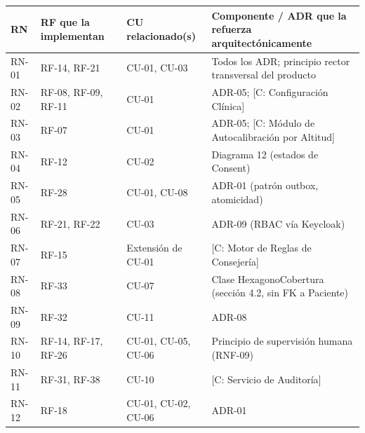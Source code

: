 \documentclass[11pt,a4paper]{article}
\begin{document}
{\small
\begin{longtable}[]{@{}
  >{\raggedright\arraybackslash}p{}
  >{\raggedright\arraybackslash}p{}
  >{\raggedright\arraybackslash}p{}
  >{\raggedright\arraybackslash}p{}@{}}
\toprule\noalign{}
\begin{minipage}[b]{\linewidth}\raggedright
RN
\end{minipage} & \begin{minipage}[b]{\linewidth}\raggedright
RF que la implementan
\end{minipage} & \begin{minipage}[b]{\linewidth}\raggedright
CU relacionado(s)
\end{minipage} & \begin{minipage}[b]{\linewidth}\raggedright
Componente / ADR que la refuerza arquitectónicamente
\end{minipage} \\
\midrule\noalign{}
\endhead
\bottomrule\noalign{}
\endlastfoot
RN-01 & RF-14, RF-21 & CU-01, CU-03 & Todos los ADR; principio rector transversal del producto \\
RN-02 & RF-08, RF-09, RF-11 & CU-01 & ADR-05; {[}C: Configuración Clínica{]} \\
RN-03 & RF-07 & CU-01 & ADR-05; {[}C: Módulo de Autocalibración por Altitud{]} \\
RN-04 & RF-12 & CU-02 & Diagrama 12 (estados de Consent) \\
RN-05 & RF-28 & CU-01, CU-08 & ADR-01 (patrón outbox, atomicidad) \\
RN-06 & RF-21, RF-22 & CU-03 & ADR-09 (RBAC vía Keycloak) \\
RN-07 & RF-15 & Extensión de CU-01 & {[}C: Motor de Reglas de Consejería{]} \\
RN-08 & RF-33 & CU-07 & Clase HexagonoCobertura (sección 4.2, sin FK a Paciente) \\
RN-09 & RF-32 & CU-11 & ADR-08 \\
RN-10 & RF-14, RF-17, RF-26 & CU-01, CU-05, CU-06 & Principio de supervisión humana (RNF-09) \\
RN-11 & RF-31, RF-38 & CU-10 & {[}C: Servicio de Auditoría{]} \\
RN-12 & RF-18 & CU-01, CU-02, CU-06 & ADR-01 \\
\end{longtable}
}
\end{document}
